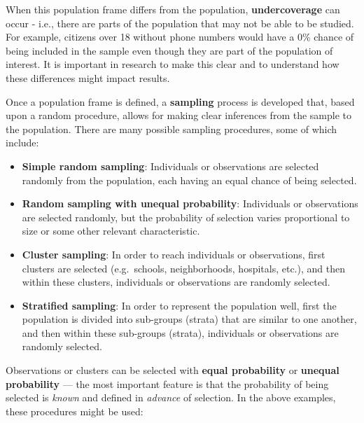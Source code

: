 \documentclass[
  letterpaper,
  DIV=11,
  numbers=noendperiod]{scrreprt}
\providecommand{\tightlist}{%
  \setlength{\itemsep}{0pt}\setlength{\parskip}{0pt}}\usepackage{longtable,booktabs,array}
\theoremstyle{definition}
\theoremstyle{remark}
\begin{document}
When this population frame differs from the population,
\textbf{undercoverage} can occur - i.e., there are parts of the
population that may not be able to be studied. For example, citizens
over 18 without phone numbers would have a 0\% chance of being included
in the sample even though they are part of the population of interest.
It is important in research to make this clear and to understand how
these differences might impact results.

Once a population frame is defined, a \textbf{sampling} process is
developed that, based upon a random procedure, allows for making clear
inferences from the sample to the population. There are many possible
sampling procedures, some of which include:

\begin{itemize}
\tightlist
\item
  \textbf{Simple random sampling}: Individuals or observations are
  selected randomly from the population, each having an equal chance of
  being selected.
\item
  \textbf{Random sampling with unequal probability}: Individuals or
  observations are selected randomly, but the probability of selection
  varies proportional to size or some other relevant characteristic.
\item
  \textbf{Cluster sampling}: In order to reach individuals or
  observations, first clusters are selected (e.g.~schools,
  neighborhoods, hospitals, etc.), and then within these clusters,
  individuals or observations are randomly selected.
\item
  \textbf{Stratified sampling}: In order to represent the population
  well, first the population is divided into sub-groups (strata) that
  are similar to one another, and then within these sub-groups (strata),
  individuals or observations are randomly selected.
\end{itemize}

Observations or clusters can be selected with \textbf{equal probability}
or \textbf{unequal probability} --- the most important feature is that
the probability of being selected is \emph{known} and defined in
\emph{advance} of selection. In the above examples, these procedures
might be used:
\end{document}
